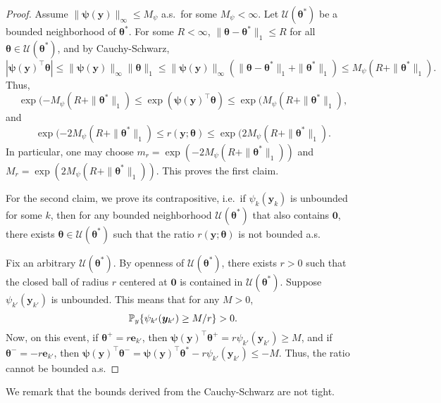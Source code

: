 \documentclass[11pt]{article}
\numberwithin{equation}{section}
\numberwithin{theorem}{section}
\def\fate{\boldsymbol{e}}
\def\faty{\boldsymbol{y}}
\def\fattheta{\boldsymbol{\theta}}
\def\fatpsi{\boldsymbol{\psi}}
\theoremstyle{definition}
\theoremstyle{remark}
\begin{document}
\begin{proof}
Assume $\|\fatpsi(\faty)\|_\infty \leq M_\psi$ a.s.~for some $M_\psi < \infty$.
Let $\mathcal{U}(\fattheta^*)$ be a bounded neighborhood of $\fattheta^*$.
For some $R < \infty$, $\|\fattheta - \fattheta^*\|_1 \leq R$ for all $\fattheta \in \mathcal{U}(\fattheta^*)$, and by Cauchy-Schwarz,
\begin{equation}
|\fatpsi(\faty)^\top \fattheta| 
\leq \|\fatpsi(\faty)\|_\infty \|\fattheta\|_1
\leq \|\fatpsi(\faty)\|_\infty (\|\fattheta - \fattheta^*\|_1 + \|\fattheta^*\|_1)
\leq M_\psi(R + \|\fattheta^*\|_1).
\end{equation}
Thus,
\begin{equation}
\exp(-M_\psi(R + \|\fattheta^*\|_1)
\leq \exp\left( \fatpsi(\faty)^\top \fattheta \right) 
\leq \exp(M_\psi(R + \|\fattheta^*\|_1),
\end{equation}
and
\begin{equation}
\exp(-2M_\psi(R + \|\fattheta^*\|_1) \leq r(\faty;\fattheta)
\leq \exp(2M_\psi(R + \|\fattheta^*\|_1).
\end{equation}
In particular, one may choose $m_r = \exp(-2M_\psi(R + \|\fattheta^*\|_1))$ and $M_r = \exp(2M_\psi(R + \|\fattheta^*\|_1))$.
This proves the first claim.

For the second claim, we prove its contrapositive, i.e.~if $\psi_k(\faty_k)$ is unbounded for some $k$, then for any bounded neighborhood $\mathcal{U}(\fattheta^*)$ that also contains $\mathbf{0}$, there exists $\fattheta \in \mathcal{U}(\fattheta^*)$ such that the ratio $r(\faty;\fattheta)$ is not bounded a.s.

Fix an arbitrary $\mathcal{U}(\fattheta^*)$.
By openness of $\mathcal{U}(\fattheta^*)$, there exists $r > 0$ such that the closed ball of radius $r$ centered at $\mathbf{0}$ is contained in $\mathcal{U}(\fattheta^*)$.
Suppose $\psi_{k'}(\faty_{k'})$ is unbounded.
This means that for any $M > 0$,
\begin{equation}
\PP_y\{ \psi_{k'}(\faty_{k'}) \geq M/r \} > 0.
\end{equation}
Now, on this event, if $\fattheta^+ = r\fate_{k'}$, then $\fatpsi(\faty)^\top \fattheta^+ = r\psi_{k'}(\faty_{k'}) \geq M$, and if $\fattheta^- = -r\fate_{k'}$, then $\fatpsi(\faty)^\top \fattheta^- = \fatpsi(\faty)^\top \fattheta^* - r\psi_{k'}(\faty_{k'}) \leq -M$.
Thus, the ratio cannot be bounded a.s.
\end{proof}

We remark that the bounds derived from the Cauchy-Schwarz are not tight.
\end{document}
